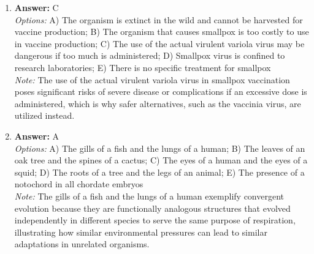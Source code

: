\documentclass[12pt]{article}
\begin{document}
\begin{enumerate}[label=\arabic*.]
\item \textbf{Answer:} C
\\ \textit{Options:} A) The organism is extinct in the wild and cannot be harvested for vaccine production; B) The organism that causes smallpox is too costly to use in vaccine production; C) The use of the actual virulent variola virus may be dangerous if too much is administered; D) Smallpox virus is confined to research laboratories; E) There is no specific treatment for smallpox
\\ \textit{Note:} The use of the actual virulent variola virus in smallpox vaccination poses significant risks of severe disease or complications if an excessive dose is administered, which is why safer alternatives, such as the vaccinia virus, are utilized instead.
\item \textbf{Answer:} A
\\ \textit{Options:} A) The gills of a fish and the lungs of a human; B) The leaves of an oak tree and the spines of a cactus; C) The eyes of a human and the eyes of a squid; D) The roots of a tree and the legs of an animal; E) The presence of a notochord in all chordate embryos
\\ \textit{Note:} The gills of a fish and the lungs of a human exemplify convergent evolution because they are functionally analogous structures that evolved independently in different species to serve the same purpose of respiration, illustrating how similar environmental pressures can lead to similar adaptations in unrelated organisms.
\end{enumerate}
\end{document}
